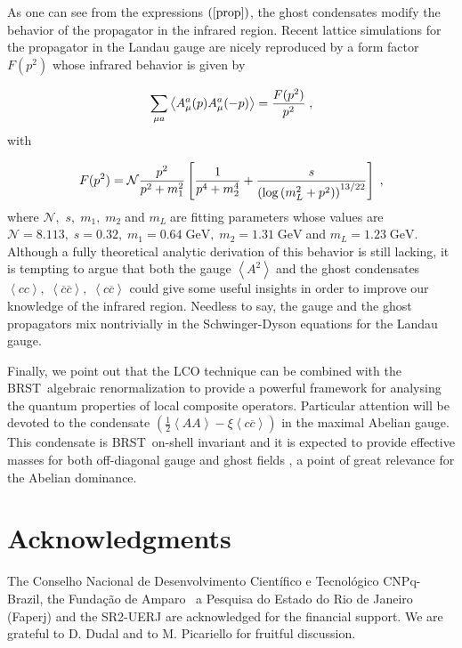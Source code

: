 \documentclass[a4paper,12pt]{article}
\begin{document}
As one can see from the expressions $\left( \ref{prop}\right) $, the ghost
condensates modify the behavior of the propagator in the infrared region.
Recent lattice simulations for the propagator in the Landau gauge are nicely
reproduced by a form factor $F(p^{2})$ whose infrared behavior is given by 
\cite{lg}

\begin{equation}
\sum_{\mu a}\left\langle A_{\mu }^{a}(p)A_{\mu }^{a}(-p)\right\rangle =\frac{%
F(p^{2})}{p^{2}}\;,  \label{gprop}
\end{equation}
with

\begin{equation}
F(p^{2})=\mathcal{N}\frac{p^{2}}{p^{2}+m_{1}^{2}}\left[ \frac{1}{%
p^{4}+m_{2}^{4}}+\frac{s}{\left( \log \left( m_{L}^{2}+p^{2}\right) \right)
^{13/22}}\right] \;,  \label{fp}
\end{equation}
where $\mathcal{N},$ $s,\;m_{1},\;m_{2}\;$and $m_{L}\;$are fitting
parameters \cite{lg} whose values are $\mathcal{N}=8.113,\;s=0.32,%
\;m_{1}=0.64\;\mathrm{GeV},\;m_{2}=1.31\;\mathrm{GeV\;}$and $m_{L}=1.23\;%
\mathrm{GeV}$. Although a fully theoretical analytic derivation of this
behavior is still lacking, it is tempting to argue that both the gauge $%
\left\langle A^{2}\right\rangle \;$and the ghost condensates $\left\langle
cc\right\rangle ,\;\left\langle \overline{c}\overline{c}\right\rangle
,\;\left\langle c\overline{c}\right\rangle $ could give some useful insights
in order to improve our knowledge of the infrared region. Needless to say,
the gauge and the ghost propagators mix nontrivially in the Schwinger-Dyson
equations for the Landau gauge.

Finally, we point out that the LCO technique can be combined with the BRST\
algebraic renormalization to provide a powerful framework for analysing the
quantum properties of local composite operators. Particular attention will
be devoted to the condensate $\left( \frac{1}{2}\left\langle AA\right\rangle
-\xi \left\langle c\overline{c}\right\rangle \right) $ in the maximal
Abelian gauge. This condensate is BRST\ on-shell invariant and it is
expected to provide effective masses for both off-diagonal gauge and ghost
fields \cite{ope,dd}, a point of great relevance for the Abelian dominance. 

\section*{Acknowledgments}

The Conselho Nacional de Desenvolvimento Cient\'{i}fico e Tecnol\'{o}gico
CNPq-Brazil, the Funda{\c{c}}{\~{a}}o de Amparo {\ a Pesquisa do Estado do
Rio de Janeiro (Faperj) and the SR2-UERJ are acknowledged for the financial
support. We are grateful to D. Dudal and to M. Picariello for fruitful
discussion. }
\end{document}
